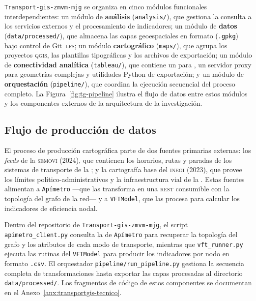 
\label{subsec:transport-gis-arquitectura-funcionamiento}

\texttt{Transport-gis-zmvm-mjg} se organiza en cinco módulos funcionales
interdependientes: un módulo de \textbf{análisis} (\texttt{analysis/}), que
gestiona la consulta a los servicios externos y el procesamiento de indicadores;
un módulo de \textbf{datos} (\texttt{data/processed/}), que almacena las capas
geoespaciales en formato  (\texttt{.gpkg}) bajo control de
Git~\textsc{lfs}; un módulo \textbf{cartográfico} (\texttt{maps/}), que agrupa
los proyectos \textsc{qgis}, las plantillas tipográficas y los archivos de
exportación; un módulo de \textbf{conectividad analítica} (\texttt{tableau/}),
que contiene un  para , un
servidor proxy para geometrías complejas y utilidades Python de exportación; y
un módulo de \textbf{orquestación} (\texttt{pipeline/}), que coordina la
ejecución secuencial del proceso completo. La Figura~\ref{fig:tg-pipeline}
ilustra el flujo de datos entre estos módulos y los componentes externos de la
arquitectura de la investigación.

\subsection{Flujo de producción de datos}
\label{subsubsec:tg-flujo-datos}

El proceso de producción cartográfica parte de dos fuentes primarias externas:
los \textit{feeds} \gtfs{} de la \textsc{semovi} (2024), que contienen los
horarios, rutas y paradas de los sistemas de transporte de la \cdmx{}; y la
cartografía base del \textsc{inegi} (2023), que provee los límites
político-administrativos y la infraestructura vial de la \zmvm{}. Estas fuentes
alimentan a \texttt{Apímetro} —que las transforma en una \api{} \textsc{rest}
consumible con la topología del grafo de la red— y a \texttt{VFTModel}, que las
procesa para calcular los indicadores de eficiencia nodal.

Dentro del repositorio de \texttt{Transport-gis-zmvm-mjg}, el script
\texttt{apimetro\_client.py} consulta la \api{} de \texttt{Apímetro} para
recuperar la topología del grafo y los atributos de cada modo de transporte,
mientras que \texttt{vft\_runner.py} ejecuta las rutinas del \texttt{VFTModel}
para producir los indicadores por nodo en formato \texttt{.csv}. El orquestador
\texttt{pipeline/run\_pipeline.py} gestiona la secuencia completa de
transformaciones hasta exportar las capas procesadas al directorio
\texttt{data/processed/}. Los fragmentos de código de estos componentes se
documentan en el Anexo~\ref{anx:transportgis-tecnico}.

